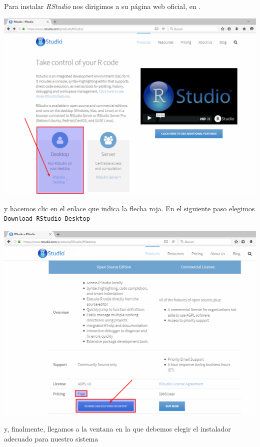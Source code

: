 \documentclass[10pt,a4paper]{article}
\begin{document}
Para instalar {\em RStudio} nos dirigimos a su página web oficial, en
.
    \begin{center}
    \includegraphics[width=15cm]{../fig/Tut00-41.png}
    \end{center}
y hacemos clic en el enlace que indica la flecha roja. En el siguiente paso elegimos {\tt Download
RStudio Desktop}
    \begin{center}
    \includegraphics[width=15cm]{../fig/Tut00-42.png}
    \end{center}
y, finalmente, llegamos a la ventana en la que debemos elegir el instalador adecuado para nuestro 
sistema
\end{document}
